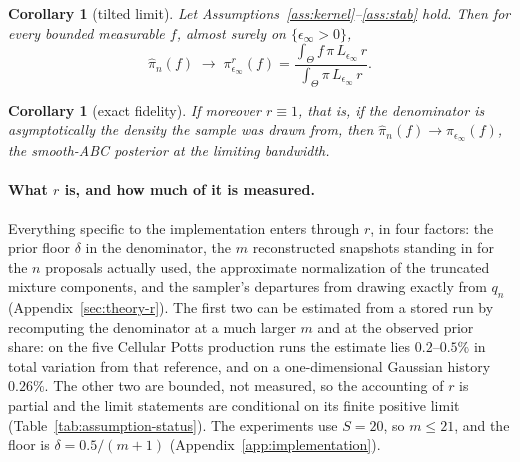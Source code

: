 \documentclass[10pt]{article}
\theoremstyle{plain}
\newtheorem{corollary}[theorem]{Corollary}
\theoremstyle{definition}
\begin{document}
\begin{corollary}[tilted limit]\label{cor:tilt}
Let Assumptions~\ref{ass:kernel}--\ref{ass:stab} hold. Then for every bounded measurable $f$, almost surely on $\{\epsilon_\infty>0\}$,
\begin{equation}
\widehat\pi_n(f)\;\longrightarrow\;\pi^{r}_{\epsilon_\infty}(f)=\frac{\int_\Theta f\,\pi\,L_{\epsilon_\infty}\,r}{\int_\Theta \pi\,L_{\epsilon_\infty}\,r}.
\label{eq:tilted-target}
\end{equation}
\end{corollary}

\begin{corollary}[exact fidelity]\label{cor:exact}
If moreover $r\equiv1$, that is, if the denominator is asymptotically the density the sample was drawn from, then $\widehat\pi_n(f)\to\pi_{\epsilon_\infty}(f)$, the smooth-ABC posterior at the limiting bandwidth.
\end{corollary}

\paragraph{What $r$ is, and how much of it is measured.} Everything specific to the implementation enters through $r$, in four factors: the prior floor $\delta$ in the denominator, the $m$ reconstructed snapshots standing in for the $n$ proposals actually used, the approximate normalization of the truncated mixture components, and the sampler's departures from drawing exactly from $q_n$ (Appendix~\ref{sec:theory-r}). The first two can be estimated from a stored run by recomputing the denominator at a much larger $m$ and at the observed prior share: on the five Cellular Potts production runs the estimate lies $0.2$--$0.5\%$ in total variation from that reference, and on a one-dimensional Gaussian history $0.26\%$. The other two are bounded, not measured, so the accounting of $r$ is partial and the limit statements are conditional on its finite positive limit (Table~\ref{tab:assumption-status}). The experiments use $S=20$, so $m\le21$, and the floor is $\delta=0.5/(m{+}1)$ (Appendix~\ref{app:implementation}).
\end{document}
